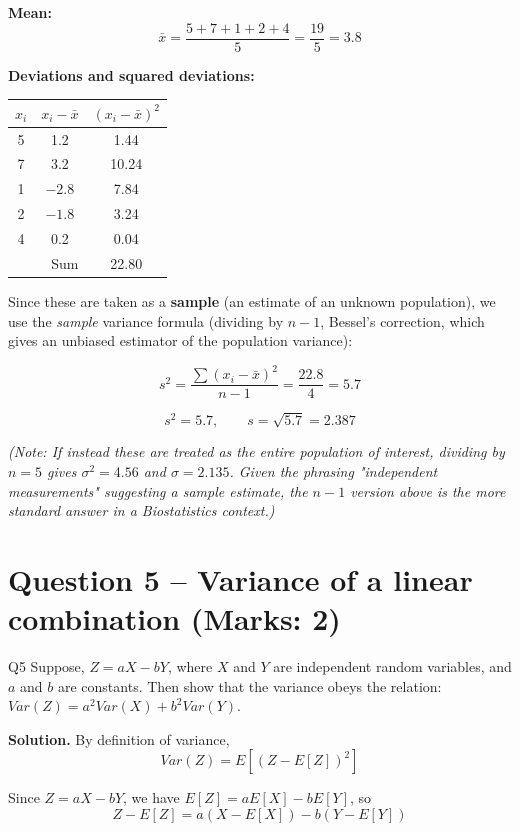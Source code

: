 \documentclass[11pt]{article}
\newcommand{\soln}{\par\noindent\textcolor{acolor}{\textbf{Solution.}}\quad}
\begin{document}
\textbf{Mean:}
\[
\bar{x} = \frac{5+7+1+2+4}{5} = \frac{19}{5} = 3.8
\]

\textbf{Deviations and squared deviations:}
\begin{center}
\begin{tabular}{c c c}
\toprule
$x_i$ & $x_i - \bar{x}$ & $(x_i-\bar{x})^2$ \\
\midrule
5 & 1.2  & 1.44 \\
7 & 3.2  & 10.24 \\
1 & $-2.8$ & 7.84 \\
2 & $-1.8$ & 3.24 \\
4 & 0.2  & 0.04 \\
\midrule
\multicolumn{2}{r}{Sum} & 22.80 \\
\bottomrule
\end{tabular}
\end{center}

Since these are taken as a \textbf{sample} (an estimate of an unknown population), we use the \emph{sample} variance formula (dividing by $n-1$, Bessel's correction, which gives an unbiased estimator of the population variance):

\[
s^2 = \frac{\sum (x_i-\bar{x})^2}{n-1} = \frac{22.8}{4} = 5.7
\]

\[
\boxed{s^2 = 5.7, \qquad s = \sqrt{5.7} = 2.387}
\]

\textit{(Note: If instead these are treated as the entire population of interest, dividing by $n=5$ gives $\sigma^2 = 4.56$ and $\sigma = 2.135$. Given the phrasing "independent measurements" suggesting a sample estimate, the $n-1$ version above is the more standard answer in a Biostatistics context.)}

\section{Question 5 -- Variance of a linear combination (Marks: 2)}
\begin{question}{Q5}
Suppose, $Z = aX - bY$, where $X$ and $Y$ are independent random variables, and $a$ and $b$ are constants. Then show that the variance obeys the relation: $Var(Z) = a^2Var(X) + b^2Var(Y)$.
\end{question}

\soln
By definition of variance,
\[
Var(Z) = E\left[(Z-E[Z])^2\right]
\]

Since $Z = aX - bY$, we have $E[Z] = aE[X] - bE[Y]$, so
\[
Z - E[Z] = a(X-E[X]) - b(Y-E[Y])
\]
\end{document}

